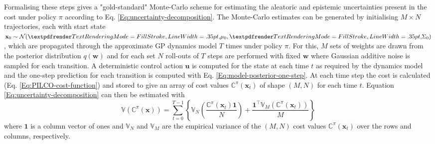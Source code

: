 Formalising these steps gives a "gold-standard" Monte-Carlo scheme for estimating the aleatoric and epistemic uncertainties present in the cost under policy $\pi$ according to Eq. \ref{Eq:uncertainty-decomposition}. The Monte-Carlo estimates can be generated by initialising $M\times N$ trajectories, each with start state $\mathbf{x}_{0} \sim \mathcal{N}(\boldgreek{\mu}_{0},\boldgreek{\Sigma}_{0})$, which are propagated through the approximate GP dynamics model $T$ times under policy $\pi$. For this, $M$ sets of weights are drawn from the posterior distribution $q(\mathbf{w})$ and for each set $N$ roll-outs of $T$ steps are performed with fixed $\mathbf{w}$ where Gaussian additive noise is sampled for each transition. A deterministic control action $\mathbf{u}$ is computed for the state at each time $t$ as required by the dynamics model and the one-step prediction for each transition is computed with Eq. \ref{Eq:model-posterior-one-step}. At each time step the cost is calculated (Eq. \ref{Eq:PILCO-cost-function}) and stored to give an array of cost values $\mathbb{C}^{\pi}(\mathbf{x}_t)$ of shape $(M,N)$ for each time $t$. Equation \ref{Eq:uncertainty-decomposition} can then be estimated with
\begin{equation}
    \mathbb{V}(\mathbb{C}^{\pi}(\mathbf{x}))=\sum^{T-1}_{t=0}\left\{\mathbb{V}_{N}\left(\frac{\mathbb{C}^{\pi}(\mathbf{x}_{t})\mathbf{1}}{N}\right)+\frac{\mathbf{1}^{\top}\mathbb{V}_{M}\left(\mathbb{C}^{\pi}(\mathbf{x}_{t})\right)}{M}\right\}
    \label{Eq:MC-uncertainty-decomposition}
\end{equation}
where $\mathbf{1}$ is a column vector of ones and $\mathbb{V}_{N}$ and $\mathbb{V}_{M}$ are the empirical variance of the $(M,N)$ cost values $\mathbb{C}^{\pi}(\mathbf{x}_t)$ over the rows and columns, respectively.

